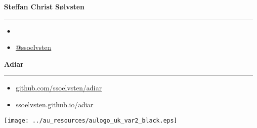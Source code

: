 \documentclass[english, aspectratio=169]{beamer}
\begin{document}
\begin{frame}
  
  {\Large \textbf{Steffan Christ Sølvsten}}
  \vspace{1pt} {\hrule width0.45\linewidth}

  \vspace{5pt}

  \begin{itemize}
  \item[\faIcon{envelope}] 
  \item[\faIcon{twitter}] \href{https://www.twitter.com/ssoelvsten}{@ssoelvsten}
  \end{itemize}

  \vspace{10pt}
  
  {\Large \textbf{Adiar}}
  \vspace{1pt} {\hrule width0.45\linewidth}

  \vspace{5pt}

  \begin{itemize}
  \item[\faIcon{code}]
    \href{http://github.com/ssoelvsten/adiar}{github.com/ssoelvsten/adiar}
  \item[\faIcon{book}\hspace{2pt}]
    \href{http://ssoelvsten.github.io/adiar}{ssoelvsten.github.io/adiar}
  \end{itemize}

  
  \vspace{10pt}
  
  \texttt{[image: ../au\_resources/aulogo\_uk\_var2\_black.eps]}
\end{frame}
\end{document}
